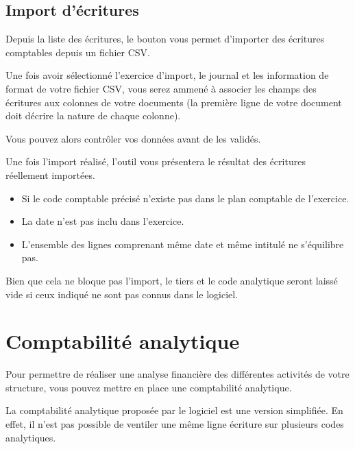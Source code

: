\documentclass[a4paper,10pt,oneside,french]{sphinxmanual}
\begin{document}
\subsection{Import d’écritures}
\label{\detokenize{accounting/entity:import-d-ecritures}}
Depuis la liste des écritures, le bouton  vous permet d’importer des écritures comptables depuis un fichier CSV.

Une fois avoir sélectionné l’exercice d’import, le journal et les information de format de votre fichier CSV,
vous serez ammené à associer les champs des écritures aux colonnes de votre documents (la première ligne de votre document doit décrire la nature de chaque colonne).
\begin{quote}

\noindent{}
\end{quote}

Vous pouvez alors contrôler vos données avant de les validés.

Une fois l’import réalisé, l’outil vous présentera le résultat des écritures réellement importées.

\begin{itemize}
\item {} 
Si le code comptable précisé n’existe pas dans le plan comptable de l’exercice.

\item {} 
La date n’est pas inclu dans l’exercice.

\item {} 
L’ensemble des lignes comprenant même date et même intitulé ne s’équilibre pas.

\end{itemize}

Bien que cela ne bloque pas l’import, le tiers et le code analytique seront laissé vide si ceux indiqué ne sont pas connus dans le logiciel.


\section{Comptabilité analytique}
\label{\detokenize{accounting/costaccounting:comptabilite-analytique}}\label{\detokenize{accounting/costaccounting::doc}}
Pour permettre de réaliser une analyse financière des différentes activités de votre structure, vous pouvez mettre en place une comptabilité analytique.

La comptabilité analytique proposée par le logiciel est une version simplifiée.
En effet, il n’est pas possible de ventiler une même ligne écriture sur plusieurs codes analytiques.
\end{document}
